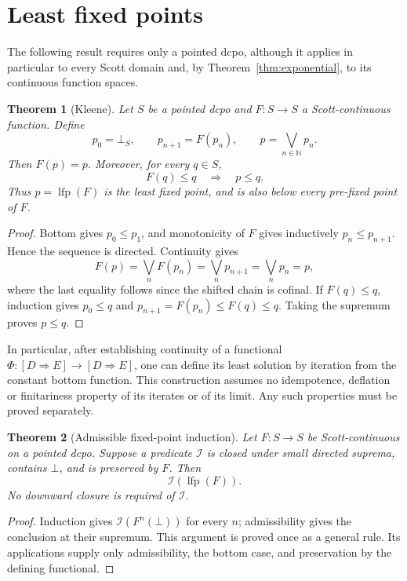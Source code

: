 \documentclass[11pt,a4paper]{article}
\newtheorem{theorem}{Theorem}[section]
\theoremstyle{definition}
\theoremstyle{remark}
\newcommand{\Cont}[2]{[#1\mathbin{\Rightarrow}#2]}
\newcommand{\lub}{\bigvee}
\newcommand{\N}{\mathbb N}
\DeclareMathOperator{\lfp}{lfp}
\begin{document}
\section{Least fixed points}

The following result requires only a pointed dcpo, although it applies
in particular to every Scott domain and, by
Theorem~\ref{thm:exponential}, to its continuous function spaces.

\begin{theorem}[Kleene]\label{thm:kleene}
Let $S$ be a pointed dcpo and $F:S\to S$ a Scott-continuous function.
Define
\[
 p_0=\bot_S,\qquad p_{n+1}=F(p_n),\qquad
 p=\lub_{n\in\N}p_n.
\]
Then $F(p)=p$. Moreover, for every $q\in S$,
\[
 F(q)\leq q\quad\Longrightarrow\quad p\leq q.
\]
Thus $p=\lfp(F)$ is the least fixed point, and is also below every
pre-fixed point of $F$.
\end{theorem}
\begin{proof}
Bottom gives $p_0\leq p_1$, and monotonicity of $F$ gives inductively
$p_n\leq p_{n+1}$. Hence the sequence is directed. Continuity gives
\[
 F(p)=\lub_n F(p_n)=\lub_n p_{n+1}=\lub_n p_n=p,
\]
where the last equality follows since the shifted chain is cofinal.
If $F(q)\leq q$, induction gives $p_0\leq q$ and
$p_{n+1}=F(p_n)\leq F(q)\leq q$. Taking the supremum proves $p\leq q$.
\end{proof}

In particular, after establishing continuity of a functional
$\Phi:\Cont D E\to\Cont D E$, one can define its least solution by
iteration from the constant bottom function. This construction assumes
no idempotence, deflation or finitariness property of its iterates or of
its limit. Any such properties must be proved separately.

\begin{theorem}[Admissible fixed-point induction]\label{thm:admissible-induction}
Let $F:S\to S$ be Scott-continuous on a pointed dcpo. Suppose a
predicate $\mathcal I$ is closed under small directed suprema, contains
$\bot$, and is preserved by $F$. Then
\[
 \mathcal I(\lfp(F)).
\]
No downward closure is required of $\mathcal I$.
\end{theorem}
\begin{proof}
Induction gives $\mathcal I(F^n(\bot))$ for every $n$; admissibility
gives the conclusion at their supremum. This argument is proved once
as a general rule. Its applications supply only admissibility, the
bottom case, and preservation by the defining functional.
\end{proof}
\end{document}
